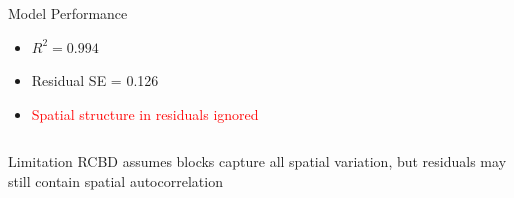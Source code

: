 \begin{frame}
\begin{columns}[T]
\begin{column}{0.5\textwidth}
            \begin{block}{Model Performance}
                \begin{itemize}
                    \item $R^2 = 0.994$
                    \item Residual SE = 0.126
                    \item \textcolor{red}{Spatial structure in residuals ignored}
                \end{itemize}
            \end{block}
        \end{column}
    \end{columns}
    
    \vspace{1em}
    
    \begin{alertblock}{Limitation}
        RCBD assumes blocks capture all spatial variation, but residuals may still contain spatial autocorrelation
    \end{alertblock}
\end{frame}

